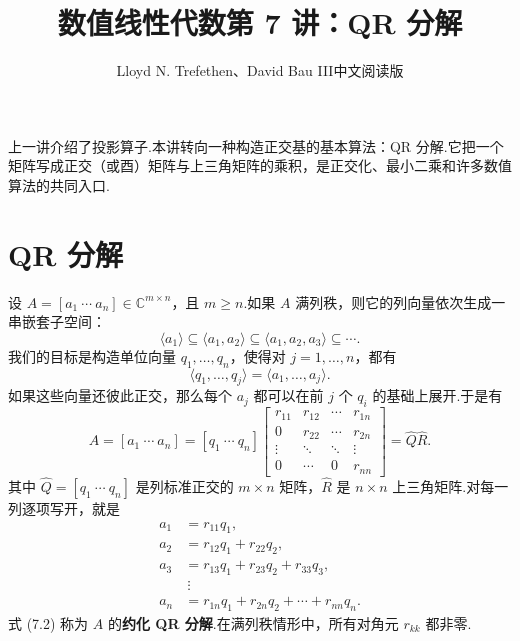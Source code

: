 \documentclass[UTF8,fontset=none,12pt]{ctexart}
\title{数值线性代数\quad 第 7 讲：QR 分解}
\author{Lloyd N. Trefethen、David Bau III\quad 中文阅读版}
\date{}
\newcommand{\C}{\mathbb{C}}
\theoremstyle{definition}
\begin{document}
\maketitle
\pagestyle{plain}

上一讲介绍了投影算子.本讲转向一种构造正交基的基本算法：QR 分解.它把一个矩阵写成正交（或酉）矩阵与上三角矩阵的乘积，是正交化、最小二乘和许多数值算法的共同入口.

\section*{QR 分解}

设 $A=[a_1\ \cdots\ a_n]\in\C^{m\times n}$，且 $m\ge n$.如果 $A$ 满列秩，则它的列向量依次生成一串嵌套子空间：
\[
    \langle a_1\rangle\subseteq\langle a_1,a_2\rangle\subseteq\langle a_1,a_2,a_3\rangle\subseteq\cdots.
\]
我们的目标是构造单位向量 $q_1,\ldots,q_n$，使得对 $j=1,\ldots,n$，都有
\begin{equation}
    \langle q_1,\ldots,q_j\rangle=\langle a_1,\ldots,a_j\rangle.
    \tag{7.1}
\end{equation}
如果这些向量还彼此正交，那么每个 $a_j$ 都可以在前 $j$ 个 $q_i$ 的基础上展开.于是有
\begin{equation}
    A=[a_1\ \cdots\ a_n]
    =[q_1\ \cdots\ q_n]
    \begin{bmatrix}
        r_{11}&r_{12}&\cdots&r_{1n}\\
        0&r_{22}&\cdots&r_{2n}\\
        \vdots&\ddots&\ddots&\vdots\\
        0&\cdots&0&r_{nn}
    \end{bmatrix}
    =\widehat Q\widehat R.
    \tag{7.2}
\end{equation}
其中 $\widehat Q=[q_1\ \cdots\ q_n]$ 是列标准正交的 $m\times n$ 矩阵，$\widehat R$ 是 $n\times n$ 上三角矩阵.对每一列逐项写开，就是
\begin{equation}
\begin{aligned}
    a_1&=r_{11}q_1,\\
    a_2&=r_{12}q_1+r_{22}q_2,\\
    a_3&=r_{13}q_1+r_{23}q_2+r_{33}q_3,\\
    &\ \vdots\\[-0.5em]
    a_n&=r_{1n}q_1+r_{2n}q_2+\cdots+r_{nn}q_n.
\end{aligned}
\tag{7.3}
\end{equation}
式 (7.2) 称为 $A$ 的\textbf{约化 QR 分解}.在满列秩情形中，所有对角元 $r_{kk}$ 都非零.
\end{document}
